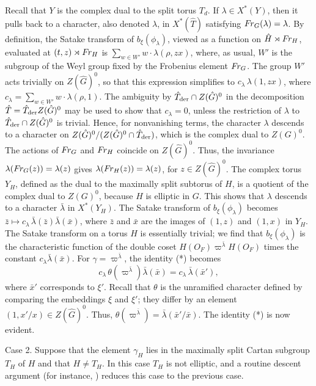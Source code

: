 Recall that $Y$ is the complex dual to the split torus $T_d$.
If $\lambda\in X^*(Y)$, then it pulls back to a character,
also denoted $\lambda$, in $X^*(\hat T)$
satisfying $\text{$F\hskip-.1em r_G$}(\lambda) = \lambda$.  
By definition, the Satake transform of $b_\xi(\phi_\lambda)$,
viewed as a function on $\hat H\rtimes \text{$F\hskip-.1em r_H$}$,
evaluated at $(t,z)\rtimes\text{$F\hskip-.1em r_H$}$ is $\sum_{w\in W'} w\cdot\lambda(\rho,zx)$,
where, as usual,  $W'$ is the subgroup of the Weyl group fixed by
the Frobenius element $\text{$F\hskip-.1em r_G$}$. 
The 
group $W'$ acts trivially on $Z(\hat G)^0$, so that this expression simplifies
to $c_\lambda\,\lambda(1,zx)$, where $c_\lambda = \sum_{w\in W'} w\cdot \lambda(\rho,1)$.
The ambiguity by $\hat T_{\text{der}}\cap Z(\hat G)^0$ in the decomposition 
$\hat T=\hat T_{\text{der}} Z(\hat G)^0$
may be used to show that $c_\lambda=0$, unless the restriction of $\lambda$ to 
$\hat T_{\text{der}}\cap Z(\hat G)^0$ is trivial.  Hence, for nonvanishing terms, 
the character $\lambda$
descends to a character on $Z(\hat G)^0/(Z(\hat G)^0\cap \hat T_{\text{der}})$,
which is the complex dual to $Z(G)^0$.
The
actions of $\text{$F\hskip-.1em r_G$}$ and $\text{$F\hskip-.1em r_H$}$ coincide on $Z(\hat G)^0$.  Thus, the invariance
$\lambda(\text{$F\hskip-.1em r_G$}(z))=\lambda(z)$ gives $\lambda(\text{$F\hskip-.1em r_H$}(z))=\lambda(z)$, for $z\in Z(\hat G)^0$.  The complex torus
$Y_H$, defined as the
 dual to the maximally split subtorus of $H$,
is a quotient of the complex dual to $Z(G)^0$, 
because $H$ is elliptic in $G$.
This shows that $\lambda$ descends to a character $\bar \lambda$ in $X^*(Y_H)$.
The Satake transform of $b_\xi(\phi_\lambda)$ becomes 
$\bar z\mapsto c_\lambda\,\bar\lambda(\bar z)\bar\lambda(\bar x)$,
where $\bar z$ and $\bar x$ are the images of $(1,z)$ and $(1,x)$ in $Y_H$.
The Satake transform on a torus $H$ is essentially trivial; we find that
$b_\xi(\phi_\lambda)$ is the characteristic function of 
the double coset $H(O_F)\varpi^{\bar \lambda}H(O_F)$
times the constant $c_\lambda\bar \lambda(\bar x)$.  
For $\gamma=\varpi^{\bar \lambda}$,
the identity (*) becomes
$$c_\lambda\,\theta(\varpi^{\bar\lambda}) \bar\lambda(\bar x) = c_\lambda\,\bar\lambda(\bar x'),$$
where $\bar x'$ corresponds to $\xi'$.  Recall that $\theta$ is the unramified
character defined by comparing the embeddings $\xi$ and $\xi'$; they differ
by an element $(1,x'/x)\in Z(\hat G)^0$.  Thus,
$\theta(\varpi^{\bar\lambda})=\bar\lambda(\bar x'/\bar x)$.
The identity (*) is now evident.
\smallskip

Case 2.  Suppose that the element $\gamma_H$ lies
in the maximally split Cartan subgroup $T_H$ of $H$ 
and that $H\ne T_H$.  In this case $T_H$ is not elliptic,
and a routine descent argument (for instance, \cite{H2,9}) reduces
this case to the previous case.
\smallskip

